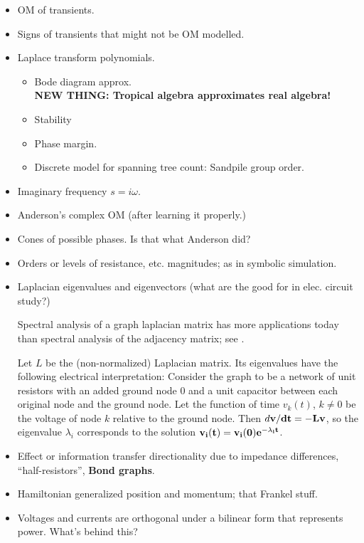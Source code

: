 \documentclass{article}
\begin{document}
\begin{itemize}
\item OM of transients.
\item Signs of transients that might not be OM modelled.
\item Laplace transform polynomials.
\begin{itemize}
\item Bode diagram approx.\\
\textbf{NEW THING: Tropical algebra approximates real algebra!}
\item Stability
\item Phase margin.
\item Discrete model for spanning tree count: Sandpile group order.
\end{itemize}

\item Imaginary frequency $s=i\omega$.
\item Anderson's complex OM (after learning it properly.)
\item Cones of possible phases.  Is that what Anderson did?
\item Orders or levels of resistance, etc. magnitudes; as
in symbolic simulation.
\item Laplacian eigenvalues and eigenvectors  (what are the good for in elec. circuit
study?) 

Spectral analysis of a graph laplacian matrix has more applications today than
spectral analysis of the adjacency matrix; see \cite{ChungSpectralGraphTheory}.

Let $L$ be the (non-normalized) Laplacian matrix.  Its eigenvalues have the 
following electrical interpretation:  
Consider the graph to be a network of unit resistors with an added ground 
node $0$ and a unit capacitor between each original node and the ground node.  
Let the function of time $v_k(t)$, $k\neq 0$ be the voltage of node $k$ 
relative to 
the ground node.  Then $d\bf{v}/dt = -L\bf{v}$, so the eigenvalue $\lambda_i$
corresponds to the solution $\bf{v}_i(t) = \bf{v}_i(0)e^{-\lambda_i t}$.

\item Effect or information transfer directionality due to impedance
differences, ``half-resistors'',  \textbf{Bond graphs}.
\item Hamiltonian generalized position and momentum; that Frankel stuff.
\item Voltages and currents are orthogonal under a bilinear form that 
represents power.  What's behind this?
\end{itemize}
\end{document}
